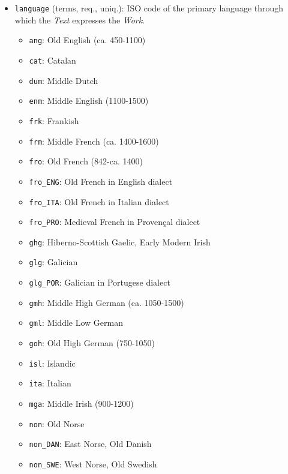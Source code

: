 \begin{itemize}
\begin{multicols}{2}
\begin{itemize}
\begin{itemize}
            \end{itemize}
        \end{itemize}
    \end{multicols}
    \item \texttt{language} (terms, req., uniq.): ISO code of the primary language through which the \textit{Text} expresses the \textit{Work}.
    \begin{multicols}{2}
        \begin{itemize}
            \item \texttt{ang}: Old English (ca. 450-1100)
            \item \texttt{cat}: Catalan
            \item \texttt{dum}: Middle Dutch
            \item \texttt{enm}: Middle English (1100-1500)
            \item \texttt{frk}: Frankish
            \item \texttt{frm}: Middle French (ca. 1400-1600)
            \item \texttt{fro}: Old French (842-ca. 1400)
            \item \texttt{fro\_ENG}: Old French in English dialect
            \item \texttt{fro\_ITA}: Old French in Italian dialect
            \item \texttt{fro\_PRO}: Medieval French in Provençal dialect
            \item \texttt{ghg}: Hiberno-Scottish Gaelic, Early Modern Irish
            \item \texttt{glg}: Galician
            \item \texttt{glg\_POR}: Galician in Portugese dialect
            \item \texttt{gmh}: Middle High German (ca. 1050-1500)
            \item \texttt{gml}: Middle Low German
            \item \texttt{goh}: Old High German (750-1050)
            \item \texttt{isl}: Islandic
            \item \texttt{ita}: Italian
            \item \texttt{mga}: Middle Irish (900-1200)
            \item \texttt{non}: Old Norse
            \item \texttt{non\_DAN}: East Norse, Old Danish
            \item \texttt{non\_SWE}: West Norse, Old Swedish

\end{itemize}
\end{multicols}
\end{itemize}
